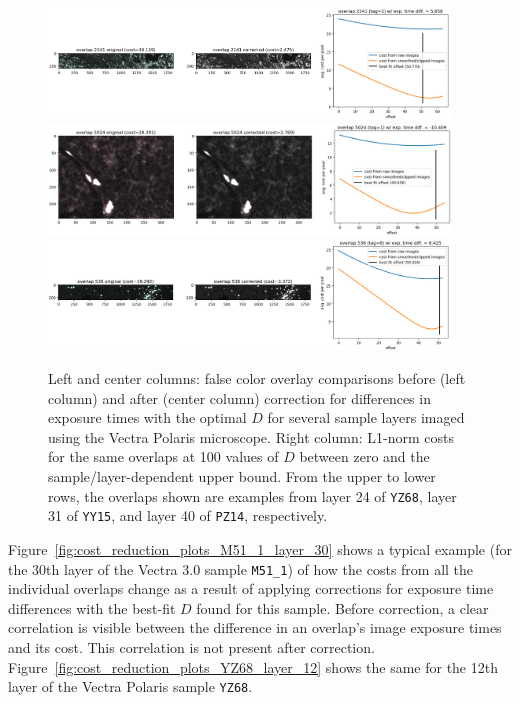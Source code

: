 \documentclass[letterpaper,11pt]{article}
\newcommand{\reffig}[1]{Figure~\ref{#1}}
\begin{document}
\begin{figure}[!ht]
\centering
\includegraphics[width=0.95\textwidth]{images/methods/cost_examples_polaris/overlay_comp_random_5023_offset=50.770}
\includegraphics[width=0.95\textwidth]{images/methods/cost_examples_polaris/overlay_comp_random_4697_offset=49.636}
\includegraphics[width=0.95\textwidth]{images/methods/cost_examples_polaris/overlay_comp_random_1916_offset=50.424}
\caption{\footnotesize Left and center columns: false color overlay comparisons before (left column) and after (center column) correction for differences in exposure times with the optimal $D$ for several sample layers imaged using the Vectra Polaris microscope. Right column: L1-norm costs for the same overlaps at 100 values of $D$ between zero and the sample/layer-dependent upper bound. From the upper to lower rows, the overlaps shown are examples from layer 24 of \texttt{YZ68}, layer 31 of \texttt{YY15}, and layer 40 of \texttt{PZ14}, respectively.}
\label{fig:overlap_cost_examples_polaris_2}
\end{figure}

\reffig{fig:cost_reduction_plots_M51_1_layer_30} shows a typical example (for the 30th layer of the Vectra 3.0 sample \texttt{M51\_1}) of how the costs from all the individual overlaps change as a result of applying corrections for exposure time differences with the best-fit $D$ found for this sample. Before correction, a clear correlation is visible between the difference in an overlap's image exposure times and its cost. This correlation is not present after correction. \reffig{fig:cost_reduction_plots_YZ68_layer_12} shows the same for the 12th layer of the Vectra Polaris sample \texttt{YZ68}.
\end{document}
